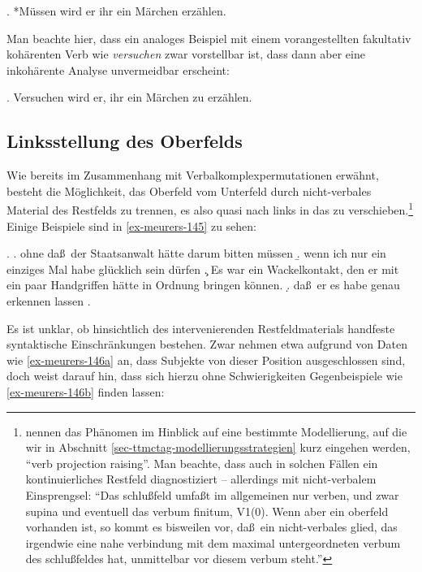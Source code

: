 \ex. *Müssen wird er ihr ein Märchen erzählen. \hfill \citep[(569a)]{Mueller:02}\label{ex-mueller-243}

Man beachte hier, dass ein analoges Beispiel mit einem vorangestellten fakultativ kohärenten Verb wie {\it versuchen} zwar vorstellbar ist, dass dann aber eine inkohärente Analyse unvermeidbar erscheint: 

\ex. Versuchen wird er, ihr ein Märchen zu erzählen.\label{ex-voran-versuchen} 



\subsection{Linksstellung des Oberfelds} \label{sec-linksstellung}

Wie bereits im Zusammenhang mit Verbalkomplexpermutationen erwähnt, be\-steht die Möglichkeit, das Oberfeld vom Unterfeld durch nicht-verbales Material des Restfelds zu trennen, es also quasi nach links in das  zu verschieben.\footnote{\cite{Haegeman:Riemsdijk:86} nennen das Phänomen im Hinblick auf eine bestimmte Modellierung, auf die wir in Abschnitt \ref{sec-ttmctag-modellierungsstrategien} kurz eingehen werden, "`verb projection raising"'. Man beachte, dass \citet[\S63]{Bech:55} auch in solchen Fällen ein kontinuierliches Restfeld diagnostiziert -- allerdings mit nicht-verbalem Einsprengsel: "`Das schlu\ss feld umfa\ss t im allgemeinen nur verben, und zwar supina und eventuell das verbum finitum, V1(0). Wenn aber ein oberfeld vorhanden ist, so kommt es bisweilen vor, da\ss\ ein nicht-verbales glied, das irgendwie eine nahe verbindung mit dem maximal untergeordneten verbum des schlu\ss feldes hat, unmittelbar vor diesem verbum steht."'} Einige Beispiele sind in \ref{ex-meurers-145} zu sehen:

\ex. \label{ex-meurers-145}
\a. ohne da\ss\ der Staatsanwalt hätte darum bitten müssen
\b. wenn ich nur ein einziges Mal habe glücklich sein dürfen
\c. Es war ein Wackelkontakt, den er mit ein paar Handgriffen hätte in Ordnung bringen können.
\d. da\ss\ er es habe genau erkennen lassen
\z. \citep[(145)]{Meurers:99}

Es ist unklar, ob hinsichtlich des intervenierenden Restfeldmaterials handfeste syntaktische Einschränkungen bestehen. Zwar nehmen etwa \cite{Kefer:Lejeune:74} aufgrund von Daten wie \ref{ex-meurers-146a} an, dass Subjekte von dieser Position ausgeschlossen sind, doch weist \cite{Meurers:99} darauf hin, dass sich hierzu ohne Schwierigkeiten Gegenbeispiele wie \ref{ex-meurers-146b} finden lassen:   


